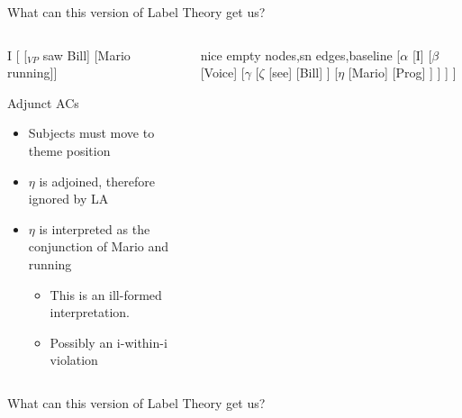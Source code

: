 \documentclass[Proposal]{subfiles}
\begin{document}
\begin{frame}
  {What can this version of Label Theory get us?}
  \begin{columns}
    \begin{column}[T]{0.55\textwidth}
      {\rm *I [ [$_{VP}$ saw Bill] [Mario running]]}
      \begin{block}
	{Adjunct ACs}
	\begin{itemize}
	  \item Subjects must move to theme position
	  \item $\eta$ is adjoined, therefore ignored by LA
	  \item $\eta$ is interpreted as the conjunction of {\rm Mario} and {\rm running}
	    \begin{itemize}
	      \item This is an ill-formed interpretation.
	      \item Possibly an i-within-i violation \parencite{vergnaud1974french}
	    \end{itemize}
	\end{itemize}
      \end{block}
    \end{column}
    \begin{column}[T]{0.45\textwidth}
      {\small
	  \begin{forest}
	    nice empty nodes,sn edges,baseline
	    [$\alpha$
	      [{\rm I}]
	      [$\beta$
		[Voice]
		[$\gamma$
		  [$\zeta$
		    [{\rm see}]
		    [{\rm Bill}]
		  ]
		  [$\eta$
		    [{\rm Mario}]
		    [Prog]
		  ]
		]
	      ]
	    ]
	  \end{forest}
	}
    \end{column}
  \end{columns}
\end{frame}
\begin{frame}
  {What can this version of Label Theory get us?}
    
\end{frame}
\end{document}
